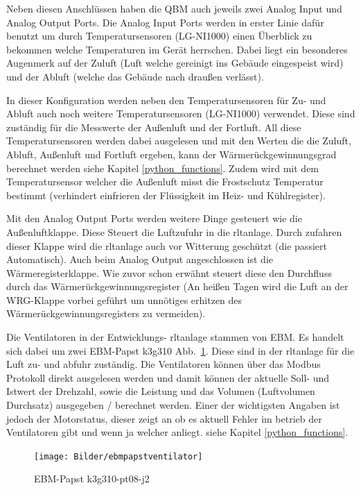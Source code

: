 Neben diesen Anschlüssen haben die QBM auch jeweils zwei Analog Input und Analog Output Ports. Die Analog Input Ports werden in erster Linie dafür benutzt um durch Temperatursensoren (LG-NI1000) einen Überblick zu bekommen welche Temperaturen im Gerät herrschen. Dabei liegt ein besonderes Augenmerk auf der Zuluft (Luft welche gereinigt ins Gebäude eingespeist wird) und der Abluft (welche das Gebäude nach draußen verlässt).

In dieser Konfiguration werden neben den Temperatursensoren für Zu- und Abluft auch noch weitere Temperatursensoren (LG-NI1000) verwendet. Diese sind zuständig für die Messwerte der Außenluft und der Fortluft. All diese Temperatursensoren werden dabei ausgelesen und mit den Werten die die Zuluft, Abluft, Außenluft und Fortluft ergeben, kann der Wärmerückgewinnungsgrad berechnet werden siehe Kapitel \ref{python_functions}. Zudem wird mit dem Temperatursensor welcher die Außenluft misst die Frostschutz Temperatur bestimmt (verhindert einfrieren der Flüssigkeit im Heiz- und Kühlregister).

Mit den Analog Output Ports werden weitere Dinge gesteuert wie \zB die Außenluftklappe. Diese Steuert die Luftzufuhr in die \ac{rltanlage}. Durch zufahren dieser Klappe wird die \ac{rltanlage} auch vor Witterung geschützt (die passiert Automatisch). Auch beim Analog Output angeschlossen ist die Wärmeregisterklappe. Wie zuvor schon erwähnt steuert diese den Durchfluss durch das Wärmerückgewinnungsregister (An heißen Tagen wird die Luft an der WRG-Klappe vorbei geführt um unnötiges erhitzen des Wärmerückgewinnungsregisters zu vermeiden).

Die Ventilatoren in der Entwicklungs- \ac{rltanlage} stammen von EBM. Es handelt sich dabei um zwei EBM-Papst k3g310 Abb.~\ref{fig:ebmpapstventilator}. Diese sind in der \ac{rltanlage} für die Luft zu- und abfuhr zuständig. Die Ventilatoren können über das Modbus Protokoll direkt ausgelesen werden und damit können der aktuelle Soll- und Istwert der Drehzahl, sowie die Leistung und das Volumen (Luftvolumen Durchsatz) ausgegeben / berechnet werden. Einer der wichtigsten Angaben ist jedoch der Motorstatus, dieser zeigt an ob es aktuell Fehler im betrieb der Ventilatoren gibt und wenn ja welcher anliegt. siehe Kapitel \ref{python_functions}.

\begin{figure}[H]
	\centering
	\texttt{[image: Bilder/ebmpapstventilator]}
	\caption{EBM-Papst k3g310-pt08-j2} 
	\label{fig:ebmpapstventilator}
\end{figure}

